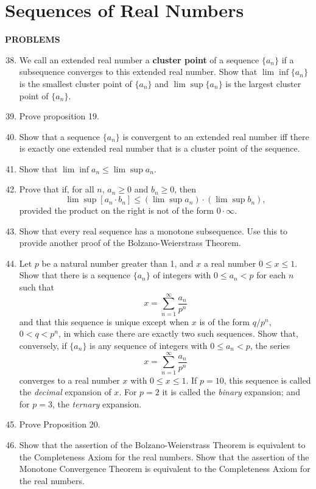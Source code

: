 \documentclass[a4paper,10pt]{book}
\theoremstyle{plain} %
\begin{document}
\section{Sequences of Real Numbers}

\begin{center}
	\textbf{PROBLEMS}
\end{center}
\begin{enumerate}
	\setcounter{enumi}{37}
	\item We call an extended real number a \textbf{cluster point} of a sequence $\{ a_n\}$ if a subsequence converges to this extended real number. Show that $\lim \inf \{a_n\}$ is the smallest cluster point of $\{a_n\}$ and $\lim \sup \{a_n\}$ is the largest cluster point of $\{a_n\}$.
	\item Prove proposition 19.
	\item Show that a sequence $\{a_n\}$ is convergent to an extended real number iff there is exactly one extended real number that is a cluster point of the sequence.
	\item Show that $\lim \inf a_n \le \lim \sup a_n$.
	\item Prove that if, for all $n$, $a_n \ge 0$ and $b_n \ge 0 $, then \[ \lim \sup [a_n \cdot b_n] \le (\lim \sup a_n) \cdot (\lim \sup b_n),\] provided the product on the right is not of the form $0 \cdot \infty.$
	\item Show that every real sequence has a monotone subsequence. Use this to provide another proof of the Bolzano-Weierstrass Theorem.
	\item Let $p$ be a natural number greater than 1, and $x$ a real number $0 \le x \le 1.$ Show that there is a sequence $\{a_n\}$ of integers with $0 \le a_n < p$ for each $n$ such that \[ x = \sum_{n=1}^\infty\dfrac{a_n}{p^n} \] 
	and that this sequence is unique except when $x$ is of the form $q/p^n$, $0<q<p^n$, in which case there are exactly two such sequences. Show that, conversely, if $\{a_n\}$ is any sequence of integers with $0\le a_n < p$, the series \[ x = \sum_{n=1}^\infty\dfrac{a_n}{p^n} \] 
	converges to a real number $x$ with $0 \le x \le 1$. If $p = 10$, this sequence is called the \textit{decimal} expansion of $x$. For $p=2$ it is called the \textit{binary} expansion; and for $p=3$, the \textit{ternary} expansion.
	\item Prove Proposition 20.
	\item Show that the assertion of the Bolzano-Weierstrass Theorem is equivalent to the Completeness Axiom for the real numbers. Show that the assertion of the Monotone Convergence Theorem is equivalent to the Completeness Axiom for the real numbers.
\end{enumerate}
\end{document}
